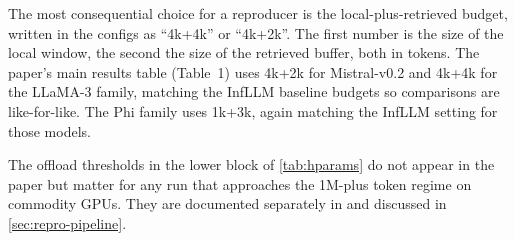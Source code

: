 The most consequential choice for a reproducer is the local-plus-retrieved budget, written in the configs as ``4k+4k'' or ``4k+2k''. The first number is the size of the local window, the second the size of the retrieved buffer, both in tokens. The paper's main results table (Table~1) uses 4k+2k for Mistral-v0.2 and 4k+4k for the LLaMA-3 family, matching the InfLLM baseline budgets so comparisons are like-for-like. The Phi family uses 1k+3k, again matching the InfLLM setting for those models.

The offload thresholds in the lower block of \cref{tab:hparams} do not appear in the paper but matter for any run that approaches the 1M-plus token regime on commodity GPUs. They are documented separately in  and discussed in \cref{sec:repro-pipeline}.
